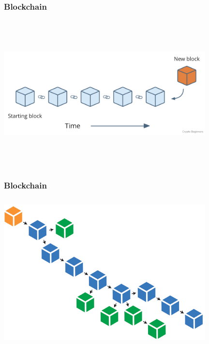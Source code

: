 \documentclass{beamer}
\begin{document}
\begin{frame}
\frametitle{Blockchain}
\includegraphics[width=11cm, height=8cm]{blockchain1}
\end{frame}

\begin{frame}
\frametitle{Blockchain}
\includegraphics[width=11cm, height=8cm]{blockchain2}
\end{frame}
\end{document}
